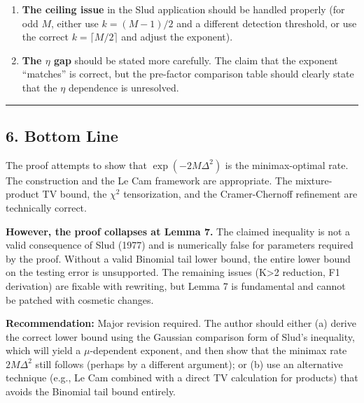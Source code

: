 \documentclass[
  12pt,
]{article}
\begin{document}
\begin{enumerate}
\def\labelenumi{\arabic{enumi}.}
\setcounter{enumi}{3}
\item
  \textbf{The ceiling issue} in the Slud application should be handled
  properly (for odd \(M\), either use \(k = (M-1)/2\) and a different
  detection threshold, or use the correct \(k = \lceil M/2\rceil\) and
  adjust the exponent).
\item
  \textbf{The \(\eta\) gap} should be stated more carefully. The claim
  that the exponent ``matches'' is correct, but the pre-factor
  comparison table should clearly state that the \(\eta\) dependence is
  unresolved.
\end{enumerate}

\begin{center}\rule{0.5\linewidth}{0.5pt}\end{center}

\subsection{6. Bottom Line}\label{bottom-line}

The proof attempts to show that \(\exp(-2M\Delta^2)\) is the
minimax-optimal rate. The construction and the Le Cam framework are
appropriate. The mixture-product TV bound, the \(\chi^2\) tensorization,
and the Cramer-Chernoff refinement are technically correct.

\textbf{However, the proof collapses at Lemma 7.} The claimed inequality
is not a valid consequence of Slud (1977) and is numerically false for
parameters required by the proof. Without a valid Binomial tail lower
bound, the entire lower bound on the testing error is unsupported. The
remaining issues (K\textgreater2 reduction, F1 derivation) are fixable
with rewriting, but Lemma 7 is fundamental and cannot be patched with
cosmetic changes.

\textbf{Recommendation:} Major revision required. The author should
either (a) derive the correct lower bound using the Gaussian comparison
form of Slud's inequality, which will yield a \(\mu\)-dependent
exponent, and then show that the minimax rate \(2M\Delta^2\) still
follows (perhaps by a different argument); or (b) use an alternative
technique (e.g., Le Cam combined with a direct TV calculation for
products) that avoids the Binomial tail bound entirely.
\end{document}
